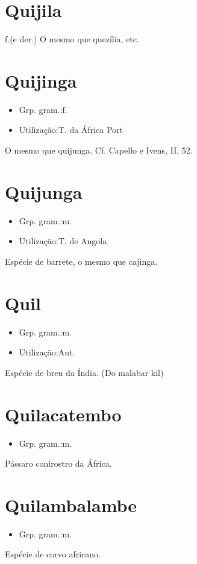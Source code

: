 \section{Quijila}
\textunderscore f.\textunderscore  (e der.)
O mesmo que \textunderscore quezília\textunderscore , etc.
\section{Quijinga}
\begin{itemize}
\item {Grp. gram.:f.}
\end{itemize}
\begin{itemize}
\item {Utilização:T. da África Port}
\end{itemize}
O mesmo que \textunderscore quijunga\textunderscore . Cf. Capello e Ivens, II, 52.
\section{Quijunga}
\begin{itemize}
\item {Grp. gram.:m.}
\end{itemize}
\begin{itemize}
\item {Utilização:T. de Angola}
\end{itemize}
Espécie de barrete, o mesmo que \textunderscore cajinga\textunderscore .
\section{Quil}
\begin{itemize}
\item {Grp. gram.:m.}
\end{itemize}
\begin{itemize}
\item {Utilização:Ant.}
\end{itemize}
Espécie de breu da Índia.
(Do malabar \textunderscore kil\textunderscore )
\section{Quilacatembo}
\begin{itemize}
\item {Grp. gram.:m.}
\end{itemize}
Pássaro conirostro da África.
\section{Quilambalambe}
\begin{itemize}
\item {Grp. gram.:m.}
\end{itemize}
Espécie de corvo africano.
